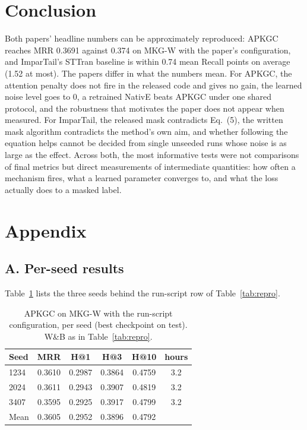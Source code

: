 \documentclass[conference,a4paper]{IEEEtran}
\begin{document}
\section{Conclusion}
Both papers' headline numbers can be approximately reproduced: APKGC reaches MRR 0.3691
against 0.374 on MKG-W with the paper's configuration, and ImparTail's STTran baseline is
within 0.74 mean Recall points on average (1.52 at most). The papers differ in what the numbers mean. For APKGC, the
attention penalty does not fire in the released code and gives no gain, the learned noise
level goes to 0, a retrained NativE beats APKGC under one shared protocol, and the
robustness that motivates the paper does not appear when measured. For ImparTail, the
released mask contradicts Eq.~(5), the written mask algorithm contradicts the method's own
aim, and whether following the equation helps cannot be decided from single unseeded runs
whose noise is as large as the effect. Across both, the most informative tests were not comparisons of final metrics
but direct measurements of intermediate quantities: how often a mechanism fires, what a
learned parameter converges to, and what the loss actually does to a masked label.

\section*{Appendix}
\subsection*{A. Per-seed results}
Table~\ref{tab:seeds} lists the three seeds behind the run-script row of
Table~\ref{tab:repro}.

\begin{table}[!h]
\centering
\caption{APKGC on MKG-W with the run-script configuration, per seed (best checkpoint on test). W\&B as in Table~\ref{tab:repro}.}
\label{tab:seeds}
\small
\setlength{\tabcolsep}{4pt}
\begin{tabular}{lccccc}
\toprule
Seed & MRR & H@1 & H@3 & H@10 & hours\\
\midrule
1234 & 0.3610 & 0.2987 & 0.3864 & 0.4759 & 3.2\\
2024 & 0.3611 & 0.2943 & 0.3907 & 0.4819 & 3.2\\
3407 & 0.3595 & 0.2925 & 0.3917 & 0.4799 & 3.2\\
\midrule
Mean & 0.3605 & 0.2952 & 0.3896 & 0.4792 & \\
\bottomrule
\end{tabular}
\end{table}
\end{document}
